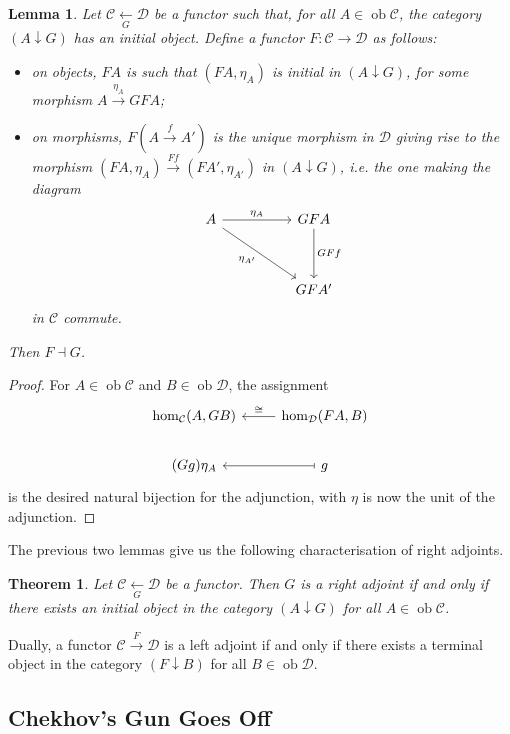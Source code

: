 \documentclass[a4paper,11pt]{article}
\theoremstyle{break_italics}
\newtheorem*{theorem*}{Theorem}
\newtheorem*{lemma*}{Lemma}
\theoremstyle{break_upright}
\theoremstyle{remark}
\newcommand{\ob}{\operatorname{ob}}
\newcommand{\C}{\mathcal{C}}
\newcommand{\D}{\mathcal{D}}
\begin{document}
\begin{lemma*}
	Let $\C \xleftarrow[G]{} \D$ be a functor such that, for all $A \in \ob\C$, the category $(A \downarrow G)$ has an initial object. Define a functor $F \colon \C \to \D$ as follows:
	\begin{itemize}
		\item on objects, $FA$ is such that $(FA, \eta_A)$ is initial in $(A \downarrow G)$, for some morphism $A \xrightarrow{\eta_A} GFA$;
		\item on morphisms, $F(A \xrightarrow{f} A')$ is the unique morphism in $\D$ giving rise to the morphism $(FA, \eta_{A}) \xrightarrow{Ff} (FA', \eta_{A'})$ in $(A \downarrow G)$, i.e. the one making the diagram
			\[
\begin{tikzcd}
A \arrow[rr, "\eta_{A}"] \arrow[rrdd, "\eta_{A'}"'] &  & GFA \arrow[dd, "GFf"] \\
                                         &  &                       \\
                                         &  & GFA'                 
\end{tikzcd}
			\]
			in $\C$ commute.
	\end{itemize}
	Then $F \dashv G$.
\end{lemma*}
\begin{proof}
	For $A \in \ob\C$ and $B \in\ob\D$, the assignment
	\[
\begin{tikzcd}
{\hom_\C(A, GB)} & {\hom_\D(FA, B)} \arrow[l, "\cong"'] \\
(Gg)\eta_A       & g \arrow[l, maps to]                 
\end{tikzcd}
	\]
	is the desired natural bijection for the adjunction, with $\eta$ is now the unit of the adjunction.
\end{proof}

The previous two lemmas give us the following characterisation of right adjoints.

\begin{theorem*}
	Let $\C \xleftarrow[G]{} \D$ be a functor. Then $G$ is a right adjoint if and only if there exists an initial object in the category $(A \downarrow G)$ for all $A \in\ob\C$.
\end{theorem*}

Dually, a functor $\C \xrightarrow{F} \D$ is a left adjoint if and only if there exists a terminal object in the category $(F \downarrow B)$ for all $B \in \ob\D$.




\subsection{Chekhov’s Gun Goes Off}
\end{document}
